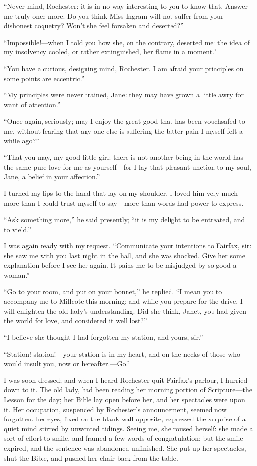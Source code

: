 \enquote{Never mind, \Mr{} Rochester: it is in no way interesting to you
	to know that.  Answer me truly once more.  Do you think Miss Ingram will
	not suffer from your dishonest coquetry?  Won't she feel forsaken and
	deserted?}

\enquote{Impossible!---when I told you how she, on the contrary,
	deserted me: the idea of my insolvency cooled, or rather extinguished,
	her flame in a moment.}

\enquote{You have a curious, designing mind, \Mr{} Rochester.  I am afraid
	your principles on some points are eccentric.}

\enquote{My principles were never trained, Jane: they may have grown a
	little awry for want of attention.}

\enquote{Once again, seriously; may I enjoy the great good that has been
	vouchsafed to me, without fearing that any one else is suffering the
	bitter pain I myself felt a while ago?}

\enquote{That you may, my good little girl: there is not another being
	in the world has the same pure love for me as yourself---for I lay that
	pleasant unction to my soul, Jane, a belief in your affection.}

I turned my lips to the hand that lay on my shoulder.  I loved him very
much---more than I could trust myself to say---more than words had power
to express.

\enquote{Ask something more,} he said presently; \enquote{it is my
	delight to be entreated, and to yield.}

I was again ready with my request.  \enquote{Communicate your intentions
	to \Mrs{} Fairfax, sir: she saw me with you last night in the hall, and
	she was shocked.  Give her some explanation before I see her again.  It
	pains me to be misjudged by so good a woman.}

\enquote{Go to your room, and put on your bonnet,} he replied.
\enquote{I mean you to accompany me to Millcote this morning; and while
	you prepare for the drive, I will enlighten the old lady's
	understanding.  Did she think, Janet, you had given the world for love,
	and considered it well lost?}

\enquote{I believe she thought I had forgotten my station, and yours,
	sir.}

\enquote{Station! station!---your station is in my heart, and on the
	necks of those who would insult you, now or hereafter.---Go.}

I was soon dressed; and when I heard \Mr{} Rochester quit \Mrs{} Fairfax's
parlour, I hurried down to it.  The old lady, had been reading her
morning portion of Scripture---the Lesson for the day; her Bible lay
open before her, and her spectacles were upon it.  Her occupation,
suspended by \Mr{} Rochester's announcement, seemed now forgotten: her
eyes, fixed on the blank wall opposite, expressed the surprise of a
quiet mind stirred by unwonted tidings.  Seeing me, she roused herself:
she made a sort of effort to smile, and framed a few words of
congratulation; but the smile expired, and the sentence was abandoned
unfinished.  She put up her spectacles, shut the Bible, and pushed her
chair back from the table.


